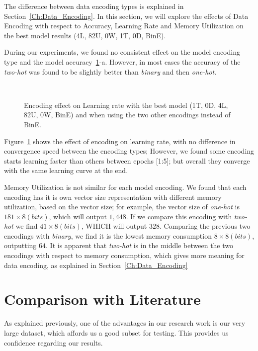 The difference between data encoding types is explained in Section~\ref{Ch:Data_Encoding}. 
In this section, we will explore the effects of Data Encoding with respect to Accuracy, Learning Rate and Memory Utilization on the best model results (4L, 82U, 0W, 1T, 0D, BinE). 

During our experiments, we found no consistent effect on the model encoding type and the model accuracy~\ref{Fig:Convergence_Memory}-a. However, in most cases the accuracy of the \textit{two-hot} was found to be slightly better than \textit{binary} and then \textit{one-hot}.


\begin{figure}[!t]
 \centering
 \begin{tikzpicture}
 
 \end{tikzpicture}
 \caption{Encoding effect on Learning rate with the best model (1T, 0D, 4L, 82U, 0W, BinE) and when using the two other encodings instead of BinE.}~\label{Fig:Convergence_Memory}%
\end{figure}


Figure~\ref{Fig:Convergence_Memory} shows the effect of encoding on learning rate, with no difference in convergence speed between the encoding types; However, we found some encoding starts learning faster than others between epochs [1:5]; but overall they converge with the same learning curve at the end.

Memory Utilization is not similar for each model encoding. We found that each encoding has it is own vector size representation with different memory utilization, based on the vector size; for example, the vector size of \textit{one-hot} is $181 \times 8(bits)$, which will output $1,448$. If we compare this encoding with \textit{two-hot} we find $41 \times 8(bits)$, WHICH will output $328$. Comparing the previous two encodings with \textit{binary}, we find it is the lowest memory consumption $8 \times 8(bits)$, outputting $64$. It is apparent that \textit{two-hot} is in the middle between the two encodings with respect to memory consumption, which gives more meaning for data encoding, as explained in Section~\ref{Ch:Data_Encoding}

\section{Comparison with Literature}
As explained previously, one of the advantages in our research work is our very large dataset, which affords us a good subset for testing. This provides us confidence regarding our results.

